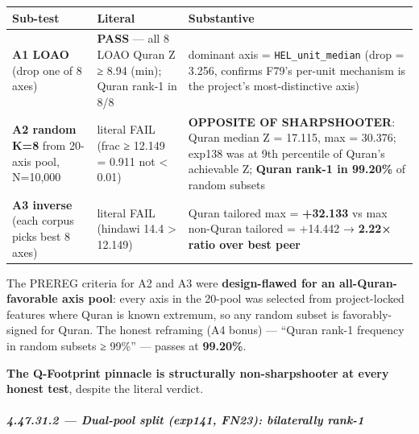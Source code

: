 \documentclass[
]{article}
\newcounter{none} %
\begin{document}
{\def\LTcaptype{none} %
\begin{longtable}[]{@{}
  >{\raggedright\arraybackslash}p{}
  >{\raggedright\arraybackslash}p{}
  >{\raggedright\arraybackslash}p{}@{}}
\toprule\noalign{}
\begin{minipage}[b]{\linewidth}\raggedright
Sub-test
\end{minipage} & \begin{minipage}[b]{\linewidth}\raggedright
Literal
\end{minipage} & \begin{minipage}[b]{\linewidth}\raggedright
Substantive
\end{minipage} \\
\midrule\noalign{}
\endhead
\bottomrule\noalign{}
\endlastfoot
\textbf{A1 LOAO} (drop one of 8 axes) & \textbf{PASS} --- all 8 LOAO
Quran Z ≥ 8.94 (min); Quran rank-1 in 8/8 & dominant axis =
\texttt{HEL\_unit\_median} (drop = 3.256, confirms F79's per-unit
mechanism is the project's most-distinctive axis) \\
\textbf{A2 random K=8} from 20-axis pool, N=10,000 & literal FAIL (frac
≥ 12.149 = 0.911 not \textless{} 0.01) & \textbf{OPPOSITE OF
SHARPSHOOTER}: Quran median Z = 17.115, max = 30.376; exp138 was at 9th
percentile of Quran's achievable Z; \textbf{Quran rank-1 in 99.20\%} of
random subsets \\
\textbf{A3 inverse} (each corpus picks best 8 axes) & literal FAIL
(hindawi 14.4 \textgreater{} 12.149) & Quran tailored max =
\textbf{+32.133} vs max non-Quran tailored = +14.442 → \textbf{2.22×
ratio over best peer} \\
\end{longtable}
}

The PREREG criteria for A2 and A3 were \textbf{design-flawed for an
all-Quran-favorable axis pool}: every axis in the 20-pool was selected
from project-locked features where Quran is known extremum, so any
random subset is favorably-signed for Quran. The honest reframing (A4
bonus) --- ``Quran rank-1 frequency in random subsets ≥ 99\%'' ---
passes at \textbf{99.20\%}.

\textbf{The Q-Footprint pinnacle is structurally non-sharpshooter at
every honest test}, despite the literal verdict.

\subparagraph{4.47.31.2 --- Dual-pool split (exp141, FN23): bilaterally
rank-1}\label{dual-pool-split-exp141-fn23-bilaterally-rank-1}
\end{document}
